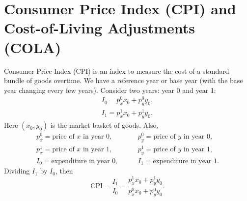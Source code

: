 \documentclass[12pt,a4paper]{article}
\begin{document}
\section{Consumer Price Index (CPI) and Cost-of-Living Adjustments (COLA)}
Consumer Price Index (CPI) is an index to measure the cost of a standard bundle of goods overtime. We have a reference year or base year (with the base year changing every few years). Consider two years: year 0 and year 1:
\begin{eqnarray*}
  I_0=p_x^0x_0+p_y^0y_0, \\
  I_1=p_x^1x_0+p_y^1y_0.
\end{eqnarray*} 
Here \((x_0,y_0)\) is the market basket of goods. Also,
\begin{eqnarray*}
  p_x^0=\text{price of }x\text{ in year }0,&\qquad
  p_y^0=\text{price of }y\text{ in year }0, \\
  p_x^1=\text{price of }x\text{ in year }1,&\qquad
  p_y^1=\text{price of }y\text{ in year }1, \\
  I_0=\text{expenditure in year }0,&\qquad
  I_1=\text{expenditure in year }1.
\end{eqnarray*}
Dividing \(I_1\) by \(I_0\), then
\[
    \mathrm{CPI}
    =\frac{I_1}{I_0}
    =\frac{p_x^1x_0+p_y^1y_0}{p_x^0x_0+p_y^0y_0}.
\]
\end{document}
